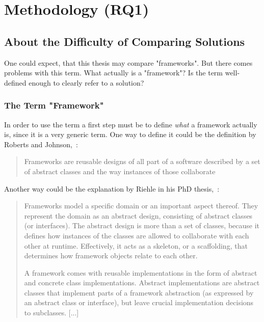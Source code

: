 \chapter{Methodology (RQ1)}\label{chap:methodology}
\section{About the Difficulty of Comparing Solutions}\label{def:framework}

One could expect, that this thesis may compare "frameworks". But there comes problems with this term. What actually is a "framework"? Is the term well-defined enough to clearly refer to a solution?

\subsection{The Term "Framework"}

In order to use the term a first step must be to define \emph{what} a framework actually is, since it is a very generic term. One way to define it could be the definition by Roberts and Johnson,~\cite{roberts1996evolving}:

\begin{quotation}
Frameworks are reusable designs of all part of a software described by a set of abstract classes and the way instances of those collaborate
\end{quotation}

Another way could be the explanation by Riehle in his PhD thesis,~\cite{riehle2000framework}:

\begin{quotation}
Frameworks model a specific domain or an important aspect thereof. They represent the domain as an abstract design, consisting of abstract classes (or interfaces). The abstract design is more than a set of classes, because it defines how instances of the classes are allowed to collaborate with each other at runtime. Effectively, it acts as a skeleton, or a scaffolding, that determines how framework objects relate to each other.

A framework comes with reusable implementations in the form of abstract and concrete class implementations. Abstract implementations are abstract classes that implement parts of a framework abstraction (as expressed by an abstract class or interface), but leave crucial implementation decisions to subclasses. [...]
\end{quotation}

